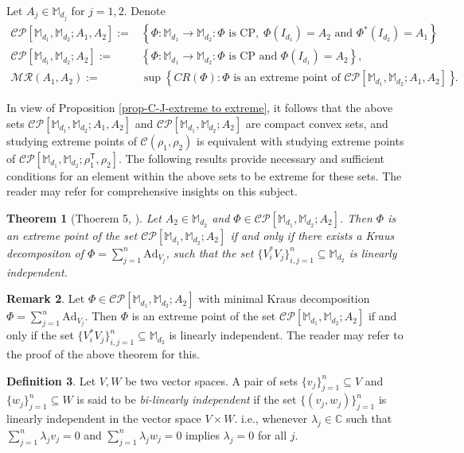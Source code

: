 \documentclass[10pt,reqno]{amsart}
\theoremstyle{definition}
\newtheorem{defn}{Definition}[section]
\newtheorem{rmk}[defn]{Remark}
\theoremstyle{plain}
\newtheorem{thm}[defn]{Theorem}
\theoremstyle{remark}
\renewcommand{\sf}[1]{\textsf{#1}}
\newcommand{\mbb}[1]{\mathbb{#1}}
\newcommand{\msc}[1]{\mathscr{#1}}
\newcommand{\M}[1]{\mbb{M}_{#1}}%
\DeclareMathOperator{\T}{\sf{T}}
\numberwithin{equation}{section}%
\begin{document}
 
 
 Let $A_j\in\M{d_j}$ for $j=1,2$. Denote
 \begin{align*}
 	\msc{CP}[\M{d_1},\M{d_2}; A_1,A_2]:=&\left\{\Phi:\M{d_1}\to\M{d_2}: \Phi \mbox{ is CP},\; \Phi(I_{d_1})=A_2 \text{ and } \Phi^*(I_{d_2})=A_1\right\},\\
 	\msc{CP}[\M{d_1},\M{d_2}; A_2]:=&\left\{\Phi:\M{d_1}\to\M{d_2}: \Phi \mbox{ is CP and }\Phi(I_{d_1})=A_2\right\},\\
 	\msc{MR}(A_1,A_2):=&\sup\left\{CR(\Phi): \Phi \text{ is an extreme point of }\msc{CP}[\M{d_1},\M{d_2}; A_1, A_2]\right\}.
 \end{align*}
 
 
 
 
 In view of Proposition \ref{prop-C-J-extreme to extreme}, it follows that the above sets $ \msc{CP}[\M{d_1},\M{d_2}; A_1, A_2]$ and $\msc{CP}[\M{d_1},\M{d_2}; A_2]$ are compact convex sets, and studying extreme points of $\msc{C}(\rho_1, \rho_2)$ is equivalent with studying extreme points of $\msc{CP}[\M{d_1},\M{d_2}; \rho_1^{\T}, \rho_2]$. The following results provide necessary and sufficient conditions for an element within the above sets to be extreme for these sets. The reader may refer \cite{Cho75, krp98, krp05, Ru04} for comprehensive insights on this subject.
 
 
  \begin{thm}[Thoerem 5, \cite{Cho75}]\label{choi}
 	Let $A_2\in\M{d_2}$ and $\Phi\in \msc{CP}[\M{d_1},\M{d_2}; A_2]$. Then $\Phi$ is an extreme point of the set $ \msc{CP}[\M{d_1},\M{d_2}; A_2]$ if and only if there exists a Kraus decompositon  of $\Phi=\sum_{j=1}^n\mathrm{Ad}_{V_j}$, such that
 	the set $\{V_i^*V_j\}_{i,j=1}^{n}\subseteq\M{d_2}$ is linearly independent.
 \end{thm}
 
 
 \begin{rmk}\label{remark}
 	Let $\Phi\in \msc{CP}[\M{d_1},\M{d_2}; A_2]$ with minimal Kraus decomposition $\Phi=\sum_{j=1}^n\mathrm{Ad}_{V_j}$. Then $\Phi$ is an extreme point of the set $ \msc{CP}[\M{d_1},\M{d_2}; A_2]$ if and only if the set $\{V_i^*V_j\}_{i,j=1}^{n}\subseteq\M{d_2}$ is linearly independent. The reader may refer to the proof of the above theorem for this.
 \end{rmk}
 
 
 \begin{defn}
 	Let $V, W$ be two vector spaces. A pair of sets $\{v_j\}_{j=1}^{n}\subseteq V$ and $\{w_j\}_{j=1}^{n}\subseteq W$ is said to be \emph{bi-linearly independent} if the set $\{(v_j,w_j)\}_{j=1}^{n}$ is linearly independent in the vector space $V\times W$. i.e., whenever $\lambda_j\in\mbb{C}$ such that $\sum_{j=1}^n\lambda_jv_j=0$ and $\sum_{j=1}^n\lambda_jw_j=0$ implies $\lambda_j=0$ for all $j$.
 \end{defn}
 
\end{document}
